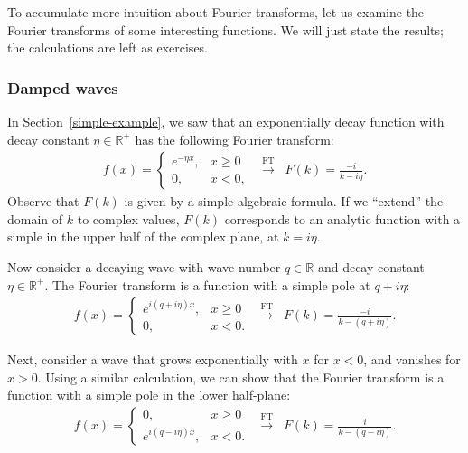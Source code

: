 \documentclass[10pt,a4paper]{article}
\begin{document}
To accumulate more intuition about Fourier transforms, let us examine
the Fourier transforms of some interesting functions.  We will just
state the results; the calculations are left as exercises.

\subsubsection{Damped waves}
\label{damped-waves}

In Section~\ref{simple-example}, we saw that an exponentially decay
function with decay constant $\eta \in \mathbb{R}^+$ has the following
Fourier transform:
\begin{align}
  f(x) = \left\{\begin{array}{cl}e^{-\eta x}, & x \ge 0 \\ 0, & x < 0,\end{array}\right. \;\;  \overset{\mathrm{FT}}{\longrightarrow} \;\; F(k) = \frac{-i}{k-i\eta}.
\end{align}
Observe that $F(k)$ is given by a simple algebraic formula. If we
``extend'' the domain of $k$ to complex values, $F(k)$ corresponds to an
analytic function with a simple in the upper half of the complex
plane, at $k = i\eta$.

Now consider a decaying wave with wave-number $q \in \mathbb{R}$ and
decay constant $\eta \in \mathbb{R}^+$. The Fourier transform is a
function with a simple pole at $q + i \eta$:
\begin{align}
  f(x) = \left\{\begin{array}{cl}e^{i (q + i\eta) x}, & x \ge 0 \\ 0, & x < 0.\end{array}\right. \;\;  \overset{\mathrm{FT}}{\longrightarrow} \;\; F(k) = \frac{-i}{k-(q + i\eta)}.
\end{align}

Next, consider a wave that grows exponentially with $x$ for $x < 0$,
and vanishes for $x > 0$. Using a similar calculation, we can show
that the Fourier transform is a function with a simple pole in the
lower half-plane:
\begin{align}
  f(x) = \left\{\begin{array}{cl}0, & x \ge 0 \\ e^{i (q - i\eta) x}, & x < 0.\end{array}\right. \;\;  \overset{\mathrm{FT}}{\longrightarrow} \;\; F(k) = \frac{i}{k-(q - i\eta)}.
\end{align}
\end{document}
